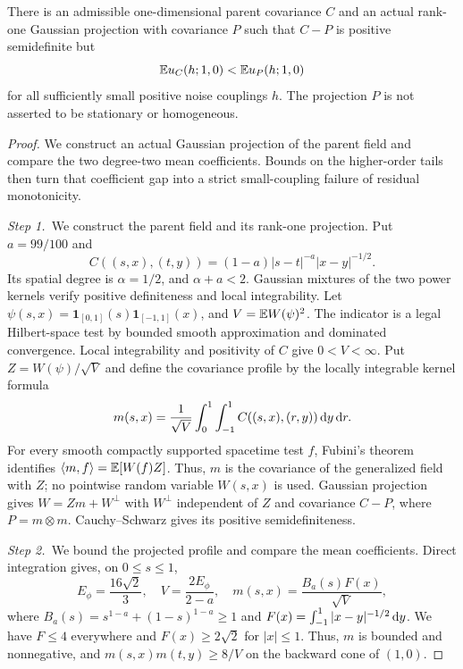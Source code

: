 \setcounter{nogo}{18}
\begin{nogo}
  \label{P:nogo-19}
  There is an admissible one-dimensional parent covariance $C$ and an
  actual rank-one Gaussian projection with covariance $P$ such that
  $C-P$ is positive semidefinite but
  \[
    \mathbb{E} u_C(h;1,0)<\mathbb{E} u_P(h;1,0)
  \]
  for all sufficiently small positive noise couplings $h$. The projection
  $P$ is not asserted to be stationary or homogeneous.
\end{nogo}
\begin{proof}
  We construct an actual Gaussian projection of the parent field and compare
  the two degree-two mean coefficients. Bounds on the higher-order tails then
  turn that coefficient gap into a strict small-coupling failure of residual
  monotonicity.


  \medskip
  \noindent\textit{Step 1.~}We construct the parent field and its rank-one
  projection.
  Put $a=99/100$ and
  \[
    C((s,x),(t,y))=(1-a)|s-t|^{-a}|x-y|^{-1/2}.
  \]
  Its spatial degree is $\alpha=1/2$, and $\alpha+a<2$. Gaussian mixtures
  of the two power kernels verify positive definiteness and local
  integrability. Let $\psi(s,x)=\mathbf1_{[0,1]}(s)\mathbf1_{[-1,1]}(x)$,
  and $V=\mathbb{E} W(\psi)^2$. The indicator is a legal Hilbert-space test by
  bounded smooth approximation and dominated convergence. Local integrability
  and positivity of $C$ give $0<V<\infty$. Put $Z=W(\psi)/\sqrt V$ and
  define the covariance profile by the locally integrable kernel formula
  \[
    m(s,x)=\frac1{\sqrt V}\int_0^1\int_{-1}^1
    C((s,x),(r,y))\,\mathrm{d} y\,\mathrm{d} r.
  \]
  For every smooth compactly supported spacetime test $f$, Fubini's
  theorem identifies $\langle m,f\rangle=\mathbb{E}[W(f)Z]$.
  Thus, $m$ is the covariance of the generalized field with $Z$; no
  pointwise random variable $W(s,x)$ is used. Gaussian projection gives
  $W=Zm+W^\perp$ with $W^\perp$ independent of $Z$ and
  covariance $C-P$, where $P=m\otimes m$. Cauchy--Schwarz gives its
  positive semidefiniteness.


  \medskip
  \noindent\textit{Step 2.~}We bound the projected profile and compare the
  mean coefficients.
  Direct integration gives, on $0\le s\le1$,
  \[
    E_\phi=\frac{16\sqrt2}{3},\quad V=\frac{2E_\phi}{2-a},\quad
    m(s,x)=\frac{B_a(s)F(x)}{\sqrt V},
  \]
  where $B_a(s)=s^{1-a}+(1-s)^{1-a}\ge1$ and
  $F(x)=\int_{-1}^1|x-y|^{-1/2}\,\mathrm{d} y$. We have $F\le4$ everywhere and
  $F(x)\ge2\sqrt2$ for $|x|\le1$. Thus, $m$ is bounded and nonnegative,
  and $m(s,x)m(t,y)\ge8/V$ on the backward cone of $(1,0)$.


\end{proof}

